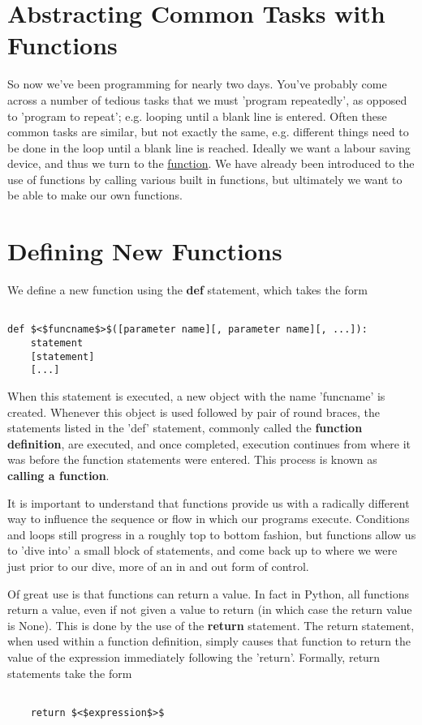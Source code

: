 \section{Abstracting Common Tasks with Functions}

So now we've been programming for nearly two days. You've probably come   across a number of tedious tasks that we must 'program repeatedly', as   opposed to 'program to repeat'; e.g. looping until a blank line is   entered. Often these common tasks are similar, but not exactly the   same, e.g. different things need to be done in the loop until a blank   line is reached. Ideally we want a labour saving device, and thus we   turn to the \href{
		http://olympiad.cs.uct.ac.za/docs/python-docs-2.6/reference/compound_stmts.html#function}{function}. We have   already been introduced to the use of functions by calling various   built in functions, but ultimately we want to be able to make our own   functions.

\section{Defining New Functions}

We define a new function using the \textbf{def} statement,   which takes the form
\begin{lstlisting}

def $<$funcname$>$([parameter name][, parameter name][, ...]):
    statement
    [statement]
    [...]
\end{lstlisting}

When this statement is executed, a new object with the name   'funcname' is created. Whenever this object is used followed by pair of   round braces, the statements listed in the 'def' statement, commonly   called the \textbf{function definition}, are executed, and once   completed, execution continues from where it was before the function   statements were entered. This process is known as \textbf{calling a   function}.

It is important to understand that functions provide us with a   radically different way to influence the sequence or flow in which our   programs execute. Conditions and loops still progress in a roughly top   to bottom fashion, but functions allow us to 'dive into' a small block   of statements, and come back up to where we were just prior to our   dive, more of an in and out form of control.

Of great use is that functions can return a value. In fact in   Python, all functions return a value, even if not given a value to   return (in which case the return value is None). This is done by the   use of the \textbf{return} statement. The return statement,   when used within a function definition, simply causes that function to   return the value of the expression immediately following the 'return'.   Formally, return statements take the form
\begin{lstlisting}

    return $<$expression$>$
\end{lstlisting}

